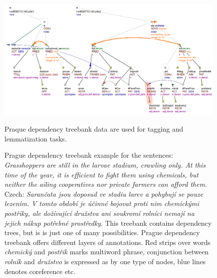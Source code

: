 \begin{figure}
\includegraphics[width=1\textwidth]{../img/prague_dep_treebank.png}
\caption[Prague Dependency Treebank example]{
Prague dependency treebank example \cite{PDT35} for the sentences:
\textit{Grasshoppers are still in the larvae stadium, crawling only. At this time of the year, it is efficient to fight them using chemicals, but neither the ailing cooperatives nor private farmers can afford them.} Czech: \textit{Sarančata jsou doposud ve stadiu larev a pohybují se pouze lezením. V tomto období je účinné bojovat proti nim chemickými postřiky, ale dožívající družstva ani soukromí rolníci nemají na jejich nákup potřebné prostředky}. This treebank contains dependency trees, but is is just one of many possibilities. Prague dependency treebank offers different layers of annotations. Red strips over words \textit{chemický} and \textit{postřik} marks multiword phrase, conjunction between \textit{rolník} and \textit{družstvo} is expressed as by one type of nodes, blue lines denotes coreference etc.} Praque dependency treebank data are used for tagging and lemmatization tasks.
\label{fig:pdt}
\end{figure}

